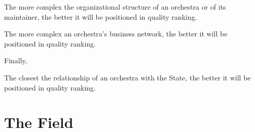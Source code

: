 \documentclass[a4paper, 12pt, openright, oneside, german, french, brazil, english]{abntex2}
\begin{document}
		
	\begin{hip}
		The more complex the organizational structure of an orchestra or of its maintainer, the better it will be positioned in quality ranking.
        \end{hip}

        \begin{hip}
          The more complex an orchestra's business network, the better it will be positioned in quality ranking.
        \end{hip}
              
	
	Finally,
	
	\begin{hip}
	The closest the relationship of an orchestra with the State, the better it will be positioned in quality ranking.
	\end{hip}
	
	


        
	\chapter{The Field}
	
\end{document}
